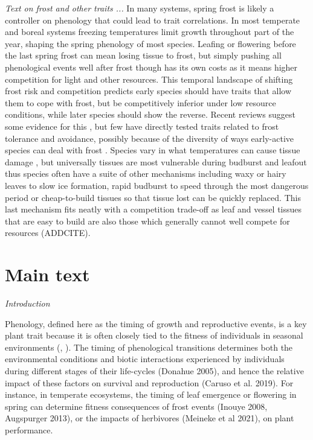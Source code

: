 \documentclass[11pt]{article}
\begin{document}
\emph{Text on frost and other traits ...} 
In many systems, spring frost is likely a controller on phenology that could lead to trait correlations. In most temperate and boreal systems freezing temperatures limit growth throughout part of the year, shaping the spring phenology of most species. Leafing or flowering before the last spring frost can mean losing tissue to frost, but simply pushing all phenological events well after frost though has its own costs as it means higher competition for light and other resources. This temporal landscape of shifting frost risk and competition predicts early species should have traits that allow them to cope with frost, but be competitively inferior under low resource conditions, while later species should show the reverse. Recent reviews suggest some evidence for this \citep{wolkovich2014aob,memegan2021}, but few have directly tested traits related to frost tolerance and avoidance, possibly because of the diversity of ways early-active species can deal with frost \citep{frostbook}. Species vary in what temperatures can cause tissue damage \citep{Lenz2013}, but universally tissues are most vulnerable during budburst and leafout \citep{frostbook,cat2019} thus species often have a suite of other mechanisms including waxy or hairy leaves to slow ice formation, rapid budburst to speed through the most dangerous period or cheap-to-build tissues so that tissue lost can be quickly replaced. This last mechanism fits neatly with a competition trade-off as leaf and vessel tissues that are easy to build are also those which generally cannot well compete for resources (ADDCITE). %

\section{Main text}

\emph{Introduction} 

Phenology, defined here as the timing of growth and reproductive events, is a key plant trait because it is often closely tied to the fitness of individuals in seasonal environments (\citet{verdu2005early}, \citet{munguia2011meta}). The timing of phenological transitions determines both the environmental conditions and biotic interactions experienced by individuals during different stages of their life-cycles (Donahue 2005), and hence the relative impact of these factors on survival and reproduction (Caruso et al. 2019). For instance, in temperate ecosystems, the timing of leaf emergence or flowering in spring can determine fitness consequences of frost events (Inouye 2008, Augspurger 2013), or the impacts of herbivores (Meineke et al 2021), on plant performance.
\end{document}
